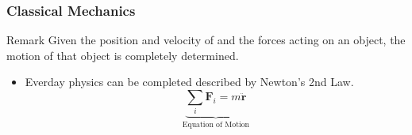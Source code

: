 \documentclass{beamer}
\begin{document}

\begin{frame}
    \frametitle{Classical Mechanics}
    \begin{block}{Remark}
        Given the position and velocity of and the forces acting on an object, the motion of that object is completely determined.
    \end{block}
    \begin{itemize}
        \item Everday physics can be completed described by Newton's 2nd Law.
              \begin{equation} \label{eq:newton}
                  \underbrace{\sum_i \mathbf{F}_i = m \ddot{\mathbf{r}}}_\text{Equation of Motion}
              \end{equation}
    \end{itemize}
\end{frame}

    
    
    
    

\nocite{*}
\begin{frame}[allowframebreaks]
\printbibliography
\end{frame}
\end{document}
